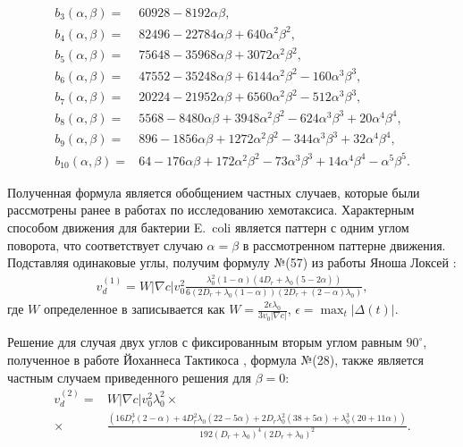 \begin{equation}
\begin{aligned}
	b_3(\alpha, \beta) =& 60928 - 8192\alpha\beta, \\
	b_4(\alpha, \beta) =& 82496 - 22784\alpha\beta + 640\alpha^2\beta^2, \\
	b_5(\alpha, \beta) =& 75648 - 35968\alpha\beta + 3072\alpha^2\beta^2, \\
	b_6(\alpha, \beta) =& 47552 - 35248\alpha\beta + 6144\alpha^2\beta^2 - 160\alpha^3\beta^3, \\
	b_7(\alpha, \beta) =& 20224 - 21952\alpha\beta + 6560\alpha^2\beta^2 - 512\alpha^3\beta^3, \\
	b_8(\alpha, \beta) =& 5568 - 8480\alpha\beta + 3948\alpha^2\beta^2 - 624\alpha^3\beta^3 + 20\alpha^4\beta^4, \\
	b_9(\alpha, \beta) =& 896 - 1856\alpha\beta + 1272\alpha^2\beta^2 - 344\alpha^3\beta^3 + 32\alpha^4\beta^4, \\
	b_{10}(\alpha, \beta) =& 64 - 176\alpha\beta + 172\alpha^2\beta^2 - 73\alpha^3\beta^3 + 14\alpha^4\beta^4 - \alpha^5 \beta^5.
\end{aligned}
\end{equation}

Полученная формула является обобщением частных случаев, которые были рассмотрены ранее в работах по исследованию хемотаксиса. Характерным способом движения для бактерии E.~coli является паттерн с одним углом поворота, что соответствует случаю $\alpha=\beta$ в рассмотренном паттерне движения. Подставляя одинаковые углы, получим формулу №(57) из работы Яноша Локсей \cite{locsei_persistence_2007}:
\begin{equation}
    \begin{aligned}
        v_d^{(1)} = W|\nabla c|v_0^2\frac{\lambda_0^2(1-\alpha)(4D_r+\lambda_0(5-2\alpha))}{6(2D_r+\lambda_0(1-\alpha))(2D_r+(2-\alpha)\lambda_0)},
    \end{aligned}
\end{equation}
где $W$ определенное в \cite{locsei_persistence_2007} записывается как $W=\frac{2\epsilon\lambda_0}{3v_0|\nabla c|}$, $\epsilon=\max_t|\Delta(t)|$.

Решение для случая двух углов с фиксированным вторым углом равным $90^\circ$, полученное в работе Йоханнеса Тактикоса \cite{taktikos_how_2013}, формула №(28), также является частным случаем приведенного решения для $\beta=0$:
\begin{equation}
    \begin{aligned}
        v_d^{(2)} =& W |\nabla c| v_0^2 \lambda_0^2 \times \\
		\times& \frac{(16D_r^3(2-\alpha) + 4D_r^2\lambda_0(22-5\alpha) + 2D_r\lambda_0^2(38+5\alpha) + \lambda_0^3(20+11\alpha))}{192(D_r+\lambda_0)^4(2D_r+\lambda_0)^2}.
    \end{aligned}
\end{equation}

